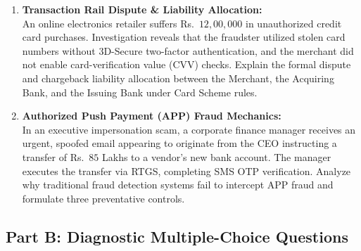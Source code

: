 \begin{enumerate}[label=\textbf{P7.\arabic*}]
    \item \textbf{Transaction Rail Dispute \& Liability Allocation:}\\
    An online electronics retailer suffers Rs.~$12{,}00{,}000$ in unauthorized credit card purchases. Investigation reveals that the fraudster utilized stolen card numbers without 3D-Secure two-factor authentication, and the merchant did not enable card-verification value (CVV) checks. 
    Explain the formal dispute and chargeback liability allocation between the Merchant, the Acquiring Bank, and the Issuing Bank under Card Scheme rules.

    \item \textbf{Authorized Push Payment (APP) Fraud Mechanics:}\\
    In an executive impersonation scam, a corporate finance manager receives an urgent, spoofed email appearing to originate from the CEO instructing a transfer of Rs.~$85$ Lakhs to a vendor's new bank account. The manager executes the transfer via RTGS, completing SMS OTP verification. Analyze why traditional fraud detection systems fail to intercept APP fraud and formulate three preventative controls.
\end{enumerate}

\subsection*{Part B: Diagnostic Multiple-Choice Questions}

